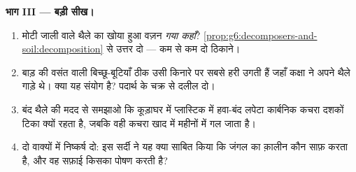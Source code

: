 \begin{problem}[{सप्ताहांत समस्या --- जाली के थैले, गाड़ी हुई पत्तियाँ,
और मृदा-विज्ञान की एक सर्दी}]
\medskip\noindent\textbf{भाग III --- बड़ी सीख।}
\begin{enumerate}[resume]
  \item मोटी जाली वाले थैले का खोया हुआ वज़न \emph{गया कहाँ}?
        \cref{prop:g6:decomposers-and-soil:decomposition} से उत्तर दो
        --- कम से कम दो ठिकाने।
  \item बाड़ की वसंत वाली बिच्छू-बूटियाँ ठीक उसी किनारे पर सबसे हरी
        उगती हैं जहाँ कक्षा ने अपने थैले गाड़े थे। क्या यह संयोग है?
        पदार्थ के चक्र से दलील दो।
  \item बंद थैले की मदद से समझाओ कि कूड़ाघर में प्लास्टिक में हवा-बंद
        लपेटा कार्बनिक कचरा दशकों टिका क्यों रहता है, जबकि वही कचरा
        खाद में महीनों में गल जाता है।
  \item दो वाक्यों में निष्कर्ष दो: इस सर्दी ने यह क्या साबित किया कि
        जंगल का क़ालीन कौन साफ़ करता है, और वह सफ़ाई किसका पोषण करती
        है?
\end{enumerate}
\end{problem}

